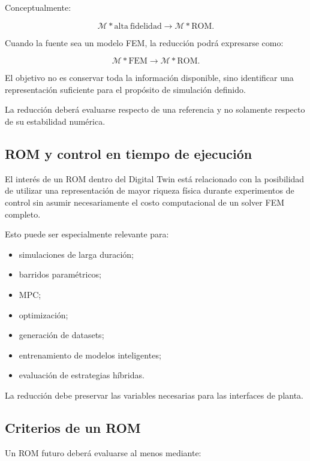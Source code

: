 Conceptualmente:

\begin{equation}
\mathcal{M}*{\mathrm{alta\ fidelidad}}
\longrightarrow
\mathcal{M}*{\mathrm{ROM}}.
\end{equation}

Cuando la fuente sea un modelo FEM, la reducción podrá expresarse como:

\begin{equation}
\mathcal{M}*{\mathrm{FEM}}
\longrightarrow
\mathcal{M}*{\mathrm{ROM}}.
\end{equation}

El objetivo no es conservar toda la información disponible, sino identificar una representación suficiente para el propósito de simulación definido.

La reducción deberá evaluarse respecto de una referencia y no solamente respecto de su estabilidad numérica.

\subsection{ROM y control en tiempo de ejecución}

El interés de un ROM dentro del Digital Twin está relacionado con la posibilidad de utilizar una representación de mayor riqueza física durante experimentos de control sin asumir necesariamente el costo computacional de un solver FEM completo.

Esto puede ser especialmente relevante para:

\begin{itemize}
\item simulaciones de larga duración;
\item barridos paramétricos;
\item MPC;
\item optimización;
\item generación de datasets;
\item entrenamiento de modelos inteligentes;
\item evaluación de estrategias híbridas.
\end{itemize}

La reducción debe preservar las variables necesarias para las interfaces de planta.

\subsection{Criterios de un ROM}

Un ROM futuro deberá evaluarse al menos mediante:

